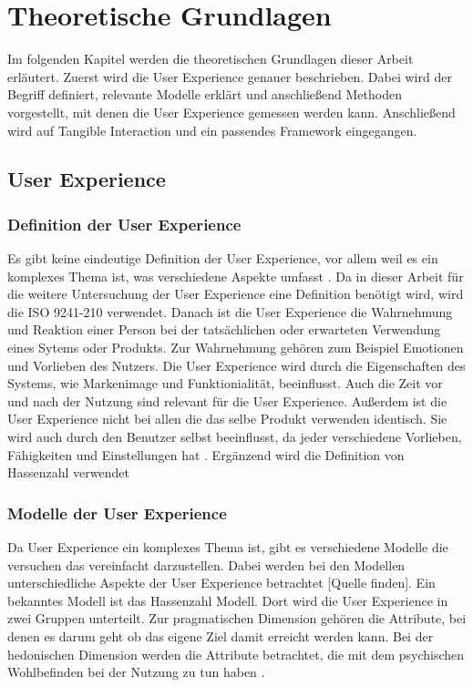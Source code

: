 \chapter{Theoretische Grundlagen}
Im folgenden Kapitel werden die theoretischen Grundlagen dieser Arbeit erläutert. Zuerst wird die User Experience genauer beschrieben. Dabei wird der Begriff definiert, relevante Modelle erklärt und anschließend Methoden vorgestellt, mit denen die User Experience gemessen werden kann. Anschließend wird auf Tangible Interaction und ein passendes Framework eingegangen.

\section{User Experience}
\subsection{Definition der User Experience}
Es gibt keine eindeutige Definition der User Experience, vor allem weil es ein komplexes Thema ist, was verschiedene Aspekte umfasst \parencite{lallemand2015user}. Da in dieser Arbeit für die weitere Untersuchung der User Experience eine Definition benötigt wird, wird die ISO 9241-210 verwendet. Danach ist die User Experience die Wahrnehmung und Reaktion einer Person bei der tatsächlichen oder erwarteten Verwendung eines Sytems oder Produkts. Zur Wahrnehmung gehören zum Beispiel Emotionen und Vorlieben des Nutzers. Die User Experience wird durch die Eigenschaften des Systems, wie Markenimage und Funktionialität, beeinflusst. Auch die Zeit vor und nach der Nutzung sind relevant für die User Experience. Außerdem ist die User Experience nicht bei allen die das selbe Produkt verwenden identisch. Sie wird auch durch den Benutzer selbst beeinflusst, da jeder verschiedene Vorlieben, Fähigkeiten und Einstellungen hat \parencite{iso9241_210}. Ergänzend wird die Definition von Hassenzahl verwendet

\subsection{Modelle der User Experience}
Da User Experience ein komplexes Thema ist, gibt es verschiedene Modelle die versuchen das vereinfacht darzustellen. Dabei werden bei den Modellen unterschiedliche Aspekte der User Experience betrachtet  [Quelle finden]. Ein bekanntes Modell ist das Hassenzahl Modell. Dort wird die User Experience in zwei Gruppen unterteilt. Zur pragmatischen Dimension gehören die Attribute, bei denen es darum geht ob das eigene Ziel damit erreicht werden kann. Bei der hedonischen Dimension werden die Attribute betrachtet, die mit dem psychischen Wohlbefinden bei der Nutzung zu tun haben \parencite{hassenzahl2004}.


